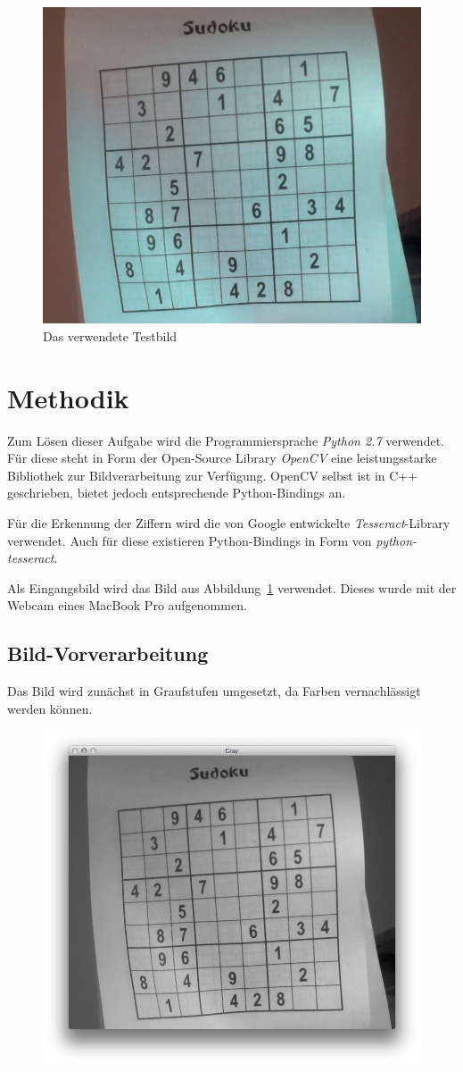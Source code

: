 
\begin{figure}[t]
    \begin{center}
        \includegraphics[width=.5\textwidth]{Abbildungen/Input}
    \end{center}
    \caption{Das verwendete Testbild}
    \label{fig:Input}
\end{figure}

\section{Methodik}
Zum Lösen dieser Aufgabe wird die Programmiersprache \emph{Python 2.7} verwendet.
Für diese steht in Form der Open-Source Library \emph{OpenCV} eine leistungsstarke Bibliothek zur Bildverarbeitung zur Verfügung.
OpenCV selbst ist in C++ geschrieben, bietet jedoch entsprechende Python-Bindings an.

Für die Erkennung der Ziffern wird die von Google entwickelte \emph{Tesseract}-Library verwendet. Auch für diese existieren Python-Bindings in Form von \emph{python-tesseract}.

Als Eingangsbild wird das Bild aus Abbildung~\ref{fig:Input} verwendet. Dieses wurde mit der Webcam eines MacBook Pro aufgenommen.

\subsection{Bild-Vorverarbeitung}
Das Bild wird zunächst in Graufstufen umgesetzt, da Farben vernachlässigt werden können.

\begin{figure}[h!]
    \begin{center}
        \includegraphics[width=.5\textwidth]{Abbildungen/gray}
    \end{center}
\end{figure}

